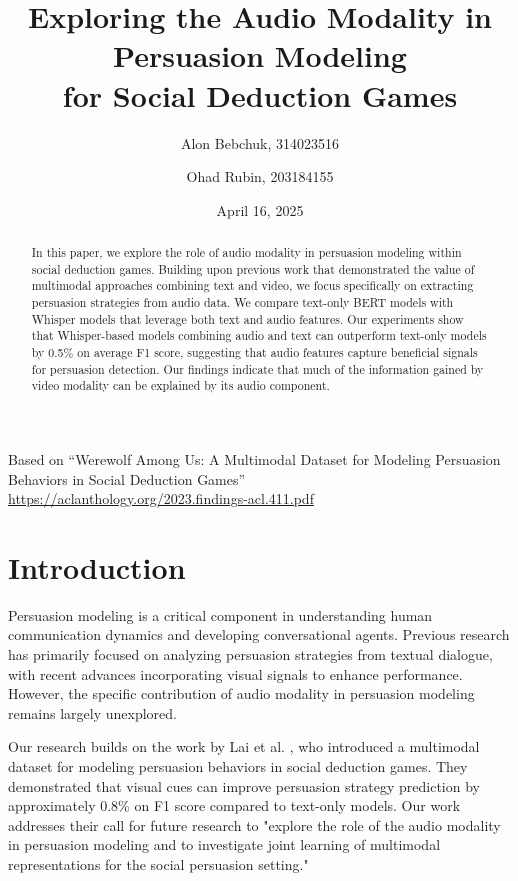 \documentclass{article}
\title{Exploring the Audio Modality in Persuasion Modeling\\
for Social Deduction Games}
\author{Alon Bebchuk, 314023516 \and Ohad Rubin, 203184155}
\date{April 16, 2025}
\begin{document}
\maketitle

\begin{center}
\small{Based on ``Werewolf Among Us: A Multimodal Dataset for Modeling Persuasion Behaviors in Social Deduction Games''}\\
\small{\url{https://aclanthology.org/2023.findings-acl.411.pdf}}
\end{center}

\begin{abstract}
In this paper, we explore the role of audio modality in persuasion modeling within social deduction games. Building upon previous work that demonstrated the value of multimodal approaches combining text and video, we focus specifically on extracting persuasion strategies from audio data. We compare text-only BERT models with Whisper models that leverage both text and audio features. Our experiments show that Whisper-based models combining audio and text can outperform text-only models by 0.5\% on average F1 score, suggesting that audio features capture beneficial signals for persuasion detection. Our findings indicate that much of the information gained by video modality can be explained by its audio component.
\end{abstract}

\section{Introduction}
Persuasion modeling is a critical component in understanding human communication dynamics and developing conversational agents. Previous research has primarily focused on analyzing persuasion strategies from textual dialogue, with recent advances incorporating visual signals to enhance performance. However, the specific contribution of audio modality in persuasion modeling remains largely unexplored.

Our research builds on the work by Lai et al. \cite{lai2022werewolf}, who introduced a multimodal dataset for modeling persuasion behaviors in social deduction games. They demonstrated that visual cues can improve persuasion strategy prediction by approximately 0.8\% on F1 score compared to text-only models. Our work addresses their call for future research to "explore the role of the audio modality in persuasion modeling and to investigate joint learning of multimodal representations for the social persuasion setting."
\end{document}
